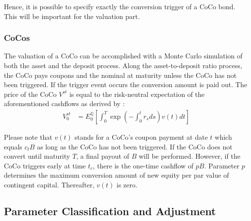 Hence, it is possible to specify exactly the conversion trigger of a CoCo bond. This will be important for the valuation part.

\subsubsection*{CoCos}
The valuation of a CoCo can be accomplished with a Monte Carlo simulation of both the asset and the deposit process. Along the asset-to-deposit ratio process, the CoCo pays coupons and the nominal at maturity unless the CoCo has not been triggered. If the trigger event occurs the conversion amount is paid out. \citep{wilkens2014contingent} The price of the CoCo $V^{st}$ is equal to the risk-neutral expectation of the aforementioned cashflows as derived by \citet{pennacchi2010structural}:
\begin{align}
V_0^{st} &= E_0^{\mathbb{Q}} \left[ \int_0^T \exp\left(-\int_0^t r_s ds\right) v\left( t \right) dt \right]
\end{align}

Please note that $v(t)$ stands for a CoCo's coupon payment at date $t$ which equals $c_t B$ as long as the CoCo has not been triggered. If the CoCo does not convert until maturity $T$, a final payout of $B$ will be performed. However, if the CoCo triggers early at time $t_c$, there is the one-time cashflow of $pB$. Parameter $p$ determines the maximum conversion amount of new equity per par value of contingent capital. Thereafter, $v(t)$ is zero.

\subsection{Parameter Classification and Adjustment}


